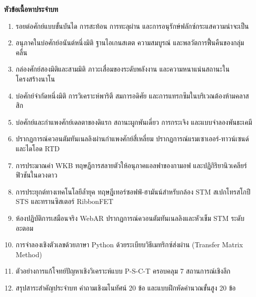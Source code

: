 \begin{lessonplanbox}
\noindent\textbf{หัวข้อเนื้อหาประจำบท}
\begin{enumerate}
    \item รอยต่อศักย์แบบขั้นบันได การสะท้อน การทะลุผ่าน และการอนุรักษ์ฟลักซ์กระแสความน่าจะเป็น
    \item อนุภาคในบ่อศักย์อนันต์หนึ่งมิติ ฐานไอเกนสเตต ความสมบูรณ์ และพลวัตการฟื้นคืนของกลุ่มคลื่น
    \item กล่องศักย์สองมิติและสามมิติ ภาวะเสื่อมของระดับพลังงาน และความหนาแน่นสถานะในโครงสร้างนาโน
    \item บ่อศักย์จำกัดหนึ่งมิติ การวิเคราะห์พาริตี สมการอดิศัย และการแทรกซึมในบริเวณต้องห้ามคลาสสิก
    \item บ่อศักย์และกำแพงศักย์เดลตาของดิแรก สถานะผูกพันเดี่ยว การกระเจิง และแบบจำลองพันธะเคมี
    \item ปรากฏการณ์ควอนตัมทันเนลลิงผ่านกำแพงศักย์สี่เหลี่ยม ปรากฏการณ์แรมเซาเออร์-ทาวน์เซนด์ และไดโอด RTD
    \item การประมาณค่า WKB ทฤษฎีการสลายตัวให้อนุภาคแอลฟาของกามอฟ และปฏิกิริยานิวเคลียร์ฟิวชันในดวงดาว
    \item การประยุกต์ทางเทคโนโลยีล้ำยุค ทฤษฎีเทอร์ซอฟฟ์-ฮามันน์สำหรับกล้อง STM สเปกโทรสโกปี STS และทรานซิสเตอร์ RibbonFET
    \item ห้องปฏิบัติการเสมือนจริง WebAR ปรากฏการณ์ควอนตัมทันเนลลิงและหัวเข็ม STM ระดับอะตอม
    \item การจำลองเชิงตัวเลขด้วยภาษา Python ด้วยระเบียบวิธีเมทริกซ์ส่งผ่าน (Transfer Matrix Method)
    \item ตัวอย่างการแก้โจทย์ปัญหาเชิงวิเคราะห์แบบ P-S-C-T ครอบคลุม 7 สถานการณ์เชิงลึก
    \item สรุปสาระสำคัญประจำบท คำถามเชิงมโนทัศน์ 20 ข้อ และแบบฝึกหัดคำนวณขั้นสูง 20 ข้อ
\end{enumerate}


\end{lessonplanbox}
